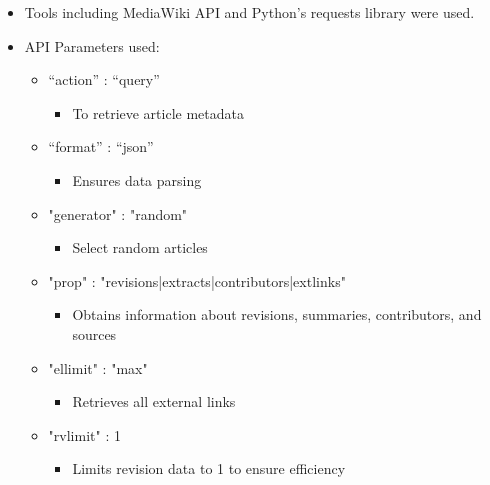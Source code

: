 \begin{itemize}
    \item Tools including MediaWiki API and Python’s requests library were used. 
    \item API Parameters used:
    
\begin{itemize}
    \item “action” : “query”
\begin{itemize}
    \item To retrieve article metadata
\end{itemize}
    \item “format” : “json”
\begin{itemize}
    \item Ensures data parsing
\end{itemize}
    \item "generator" : "random"
\begin{itemize}
    \item Select random articles
\end{itemize}
    \item "prop" : "revisions|extracts|contributors|extlinks"
\begin{itemize}
    \item Obtains information about revisions, summaries, contributors, and sources
\end{itemize}
    \item "ellimit" : "max"
\begin{itemize}
    \item Retrieves all external links
\end{itemize}
    \item "rvlimit" : 1
\begin{itemize}
    \item Limits revision data to 1 to ensure efficiency
\end{itemize}
\end{itemize}
\end{itemize}





